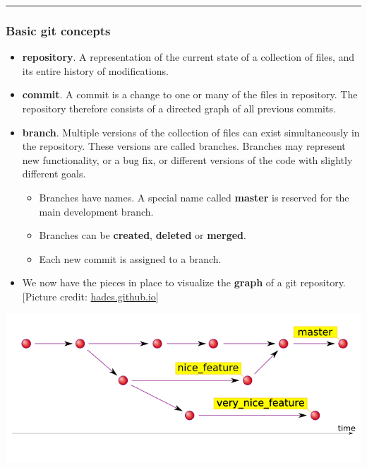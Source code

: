\documentclass[]{article}
\begin{document}
\begin{center}\rule{0.5\linewidth}{\linethickness}\end{center}

\subsubsection{Basic git concepts}\label{basic-git-concepts}

\begin{itemize}
\item
  \textbf{repository}. A representation of the current state of a
  collection of files, and its entire history of modifications.
\item
  \textbf{commit}. A commit is a change to one or many of the files in
  repository. The repository therefore consists of a directed graph of
  all previous commits.
\item
  \textbf{branch}. Multiple versions of the collection of files can
  exist simultaneously in the repository. These versions are called
  branches. Branches may represent new functionality, or a bug fix, or
  different versions of the code with slightly different goals.

  \begin{itemize}
  \item
    Branches have names. A special name called \textbf{master} is
    reserved for the main development branch.
  \item
    Branches can be \textbf{created}, \textbf{deleted} or
    \textbf{merged}.
  \item
    Each new commit is assigned to a branch.
  \end{itemize}
\item
  We now have the pieces in place to visualize the \textbf{graph} of a
  git repository. {[}Picture credit:
  \href{http://hades.github.io/media/git/git-history.png}{hades.github.io}{]}
\end{itemize}

 \includegraphics{git-history.png}
\end{document}
